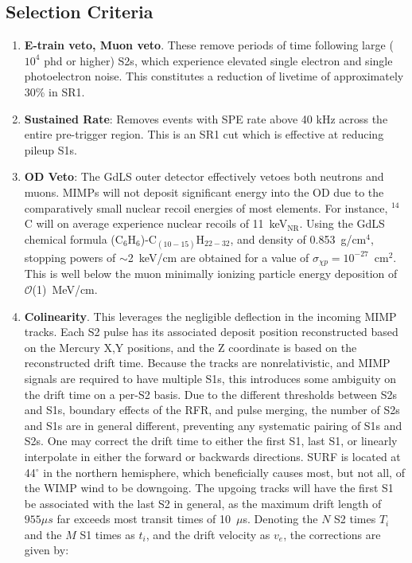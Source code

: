 \subsection{Selection Criteria}
\begin{enumerate}
    \item \textbf{E-train veto, Muon veto}. These remove periods of time following large ($10^4$ phd or higher) S2s, which experience elevated single electron and single photoelectron noise. This constitutes a reduction of livetime of approximately 30\% in SR1.
    \item \textbf{Sustained Rate}: Removes events with SPE rate above 40 kHz across the entire pre-trigger region. This is an SR1 cut which is effective at reducing pileup S1s.
    \item \textbf{OD Veto}: The GdLS outer detector effectively vetoes both neutrons and muons. 
    MIMPs  will not deposit significant energy into the OD due to the comparatively small nuclear recoil energies of most elements.
    For instance, $^{14}$C will on average experience nuclear recoils of 11~keV$_{\mathrm{NR}}$.
    Using the GdLS chemical formula\cite{haselschwardt_liquid_2019} (C$_6$H$_6$)-C$_{(10-15)}$H$_{22-32}$, and density of 0.853~g/cm$^4$, stopping powers of $\sim$2~keV/cm are obtained for a value of $\sigma_{\chi p} = 10^{-27}$~cm$^2$.
    This is well below the muon minimally ionizing particle energy deposition of $\mathcal{O}$(1)~MeV/cm.
    
    \item \textbf{Colinearity}. This leverages the negligible deflection in the incoming MIMP tracks. 
    Each S2 pulse has its associated deposit position reconstructed based on the Mercury X,Y positions\cite{lux_collaboration_position_2018}, and the Z coordinate is based on the  reconstructed drift time.
    Because the tracks are nonrelativistic, and MIMP signals are required to have multiple S1s, this introduces some ambiguity on the drift time on a per-S2 basis.
    Due to the different thresholds between S2s and S1s, boundary effects of the RFR, and pulse merging, the number of S2s and S1s are in general different, preventing any systematic pairing of S1s and S2s.
    One may correct the drift time to either the first S1, last S1, or linearly interpolate in either the forward or backwards directions.
    SURF is located at 44$^\circ$ in the northern hemisphere, which beneficially causes most, but not all, of the WIMP wind to be downgoing. 
    The upgoing tracks will have the first S1 be associated with the last S2 in general, as the maximum drift length of $955 \mu s$ far exceeds most transit times of 10~$\mu $s.
    Denoting the $N$ S2 times $T_i$ and the $M$ S1 times as $t_i$, and the drift velocity as $v_e$, the corrections are given by:
    

\end{enumerate}
